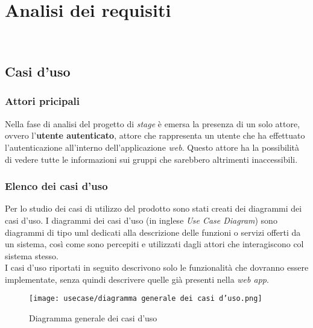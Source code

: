 
\chapter{Analisi dei requisiti}
\label{cap:analisi-requisiti}

\\

\section{Casi d'uso}
\subsection*{Attori pricipali}
Nella fase di analisi del progetto di \textit{stage} è emersa la presenza di un
solo attore, ovvero l'\textbf{utente autenticato},
attore che rappresenta un utente che ha effettuato l'autenticazione
all'interno dell'applicazione \textit{web}. Questo attore ha la possibilità di
vedere
tutte le informazioni sui gruppi che sarebbero altrimenti inaccessibili.

\subsection*{Elenco dei casi d'uso}
Per lo studio dei casi di utilizzo del prodotto sono stati creati dei diagrammi
dei casi d'uso.
I diagrammi dei casi d'uso (in inglese \emph{Use Case Diagram}) sono diagrammi
di tipo \gls{uml} dedicati alla descrizione delle funzioni o servizi offerti da
un sistema, così come sono percepiti e utilizzati dagli attori che
interagiscono col sistema stesso.\\
I casi d'uso riportati in seguito descrivono solo le funzionalità che dovranno
essere implementate, senza quindi descrivere quelle già presenti nella
\textit{web app}.
\begin{figure}[H]
    \centering
    \texttt{[image: usecase/diagramma generale dei casi
        d'uso.png]}
    \caption{Diagramma generale dei casi d'uso}
\end{figure}

